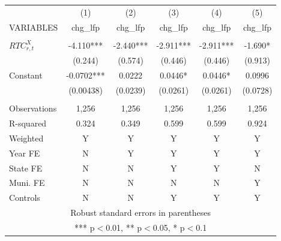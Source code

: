 \begin{tabular}{lccccc} \hline
 & (1) & (2) & (3) & (4) & (5) \\
VARIABLES & chg\_lfp & chg\_lfp & chg\_lfp & chg\_lfp & chg\_lfp \\ \hline
 &  &  &  &  &  \\
$ RTC_{r,t}^X$ & -4.110*** & -2.440*** & -2.911*** & -2.911*** & -1.690* \\
 & (0.244) & (0.574) & (0.446) & (0.446) & (0.913) \\
Constant & -0.0702*** & 0.0222 & 0.0446* & 0.0446* & 0.0996 \\
 & (0.00438) & (0.0239) & (0.0261) & (0.0261) & (0.0728) \\
 &  &  &  &  &  \\
Observations & 1,256 & 1,256 & 1,256 & 1,256 & 1,256 \\
R-squared & 0.324 & 0.349 & 0.599 & 0.599 & 0.924 \\
Weighted & Y & Y & Y & Y & Y \\
Year FE & N & Y & Y & Y & Y \\
State FE & N & N & Y & Y & N \\
Muni. FE & N & N & N & N & Y \\
 Controls & N & N & Y & Y & Y \\ \hline
\multicolumn{6}{c}{ Robust standard errors in parentheses} \\
\multicolumn{6}{c}{ *** p$<$0.01, ** p$<$0.05, * p$<$0.1} \\
\end{tabular}
